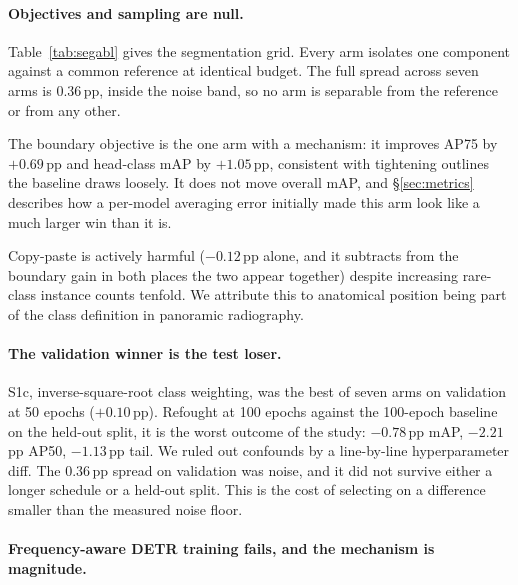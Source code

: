 \documentclass[10pt,twocolumn,letterpaper]{article}
\begin{document}
\paragraph{Objectives and sampling are null.} Table~\ref{tab:segabl} gives the
segmentation grid. Every arm isolates one component against a common reference at
identical budget. The full spread across seven arms is $0.36$\,pp, inside the
noise band, so no arm is separable from the reference or from any other.

The boundary objective is the one arm with a mechanism: it improves AP75 by
$+0.69$\,pp and head-class mAP by $+1.05$\,pp, consistent with tightening
outlines the baseline draws loosely. It does not move overall mAP, and
\S\ref{sec:metrics} describes how a per-model averaging error initially made this
arm look like a much larger win than it is.

Copy-paste is actively harmful ($-0.12$\,pp alone, and it subtracts from the
boundary gain in both places the two appear together) despite increasing rare-class
instance counts tenfold. We attribute this to anatomical position being part of
the class definition in panoramic radiography.

\paragraph{The validation winner is the test loser.} S1c, inverse-square-root
class weighting, was the best of seven arms on validation at 50 epochs
($+0.10$\,pp). Refought at 100 epochs against the 100-epoch baseline on the
held-out split, it is the worst outcome of the study: $-0.78$\,pp mAP,
$-2.21$\,pp AP50, $-1.13$\,pp tail. We ruled out confounds by a line-by-line
hyperparameter diff. The $0.36$\,pp spread on validation was noise, and it did
not survive either a longer schedule or a held-out split. This is the cost of
selecting on a difference smaller than the measured noise floor.

\paragraph{Frequency-aware DETR training fails, and the mechanism is magnitude.}
\end{document}
